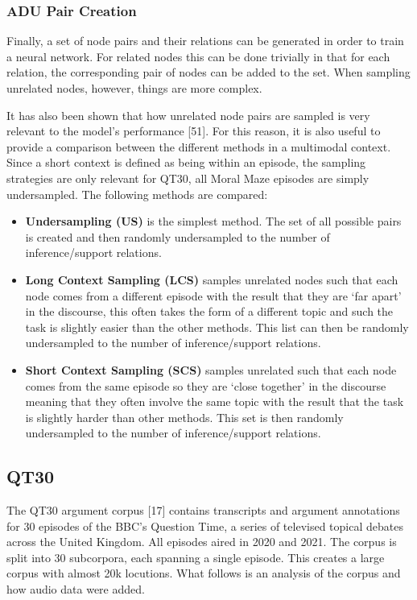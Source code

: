 \documentclass[twocolumn,twoside]{article}
\providecommand{\tightlist}{%
  \setlength{\itemsep}{0pt}\setlength{\parskip}{0pt}}
\begin{document}
\subsubsection{ADU Pair Creation}\label{sec:pair-creation}

Finally, a set of node pairs and their relations can be generated in
order to train a neural network. For related nodes this can be done
trivially in that for each relation, the corresponding pair of nodes can
be added to the set. When sampling unrelated nodes, however, things are
more complex.

It has also been shown that how unrelated node pairs are sampled is very
relevant to the model's performance {[}51{]}. For this reason, it is
also useful to provide a comparison between the different methods in a
multimodal context. Since a short context is defined as being within an
episode, the sampling strategies are only relevant for QT30, all Moral
Maze episodes are simply undersampled. The following methods are
compared:

\begin{itemize}
\tightlist
\item
  \textbf{Undersampling (US)} is the simplest method. The set of all
  possible pairs is created and then randomly undersampled to the number
  of inference/support relations.
\item
  \textbf{Long Context Sampling (LCS)} samples unrelated nodes such that
  each node comes from a different episode with the result that they are
  `far apart' in the discourse, this often takes the form of a different
  topic and such the task is slightly easier than the other methods.
  This list can then be randomly undersampled to the number of
  inference/support relations.
\item
  \textbf{Short Context Sampling (SCS)} samples unrelated such that each
  node comes from the same episode so they are `close together' in the
  discourse meaning that they often involve the same topic with the
  result that the task is slightly harder than other methods. This set
  is then randomly undersampled to the number of inference/support
  relations.
\end{itemize}

\subsection{QT30}\label{qt30}

The QT30 argument corpus {[}17{]} contains transcripts and argument
annotations for 30 episodes of the BBC's Question Time, a series of
televised topical debates across the United Kingdom. All episodes aired
in 2020 and 2021. The corpus is split into 30 subcorpora, each spanning
a single episode. This creates a large corpus with almost 20k locutions.
What follows is an analysis of the corpus and how audio data were added.
\end{document}
